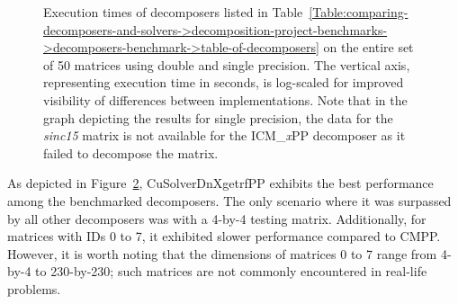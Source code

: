 \begin{figure}[ht!]
\begin{subfigure}{\textwidth}
		\label{Figure:comparing-decomposers-and-solvers->decomposition-project-benchmarks->decomposers-benchmark->comparison-of-execution-time-on-all-matrices->single-precision}
	\end{subfigure}
	\caption{Execution times of decomposers listed in Table~\ref{Table:comparing-decomposers-and-solvers->decomposition-project-benchmarks->decomposers-benchmark->table-of-decomposers} on the entire set of 50 matrices using double and single precision.
		The vertical axis, representing execution time in seconds, is log-scaled for improved visibility of differences between implementations.
		Note that in the graph depicting the results for single precision, the data for the \textit{sinc15} matrix is not available for the ICM\_\textit{x}PP decomposer as it failed to decompose the matrix.
	}
	\label{Figure:comparing-decomposers-and-solvers->decomposition-project-benchmarks->decomposers-benchmark->comparison-of-execution-time-on-all-matrices->double-and-single-precision}
\end{figure}

As depicted in Figure~\ref{Figure:comparing-decomposers-and-solvers->decomposition-project-benchmarks->decomposers-benchmark->comparison-of-execution-time-on-all-matrices->double-and-single-precision}, CuSolverDnXgetrfPP exhibits the best performance among the benchmarked decomposers.
The only scenario where it was surpassed by all other decomposers was with a 4-by-4 testing matrix.
Additionally, for matrices with IDs 0 to 7, it exhibited slower performance compared to CMPP.
However, it is worth noting that the dimensions of matrices 0 to 7 range from 4-by-4 to 230-by-230; such matrices are not commonly encountered in real-life problems.

